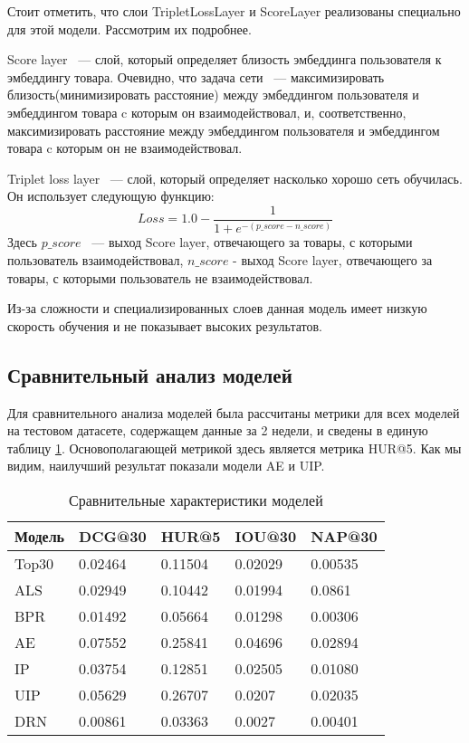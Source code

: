\documentclass[14pt]{mmcs_article}
\begin{document}
Стоит отметить, что слои TripletLossLayer и ScoreLayer реализованы специально для этой модели. Рассмотрим их подробнее.

Score layer  ~--- слой, который определяет близость эмбеддинга пользователя к эмбеддингу товара. Очевидно, что задача сети ~---  максимизировать близость(минимизировать расстояние) между эмбеддингом пользователя и эмбеддингом товара c которым он взаимодействовал, и, соответственно, максимизировать расстояние между эмбеддингом пользователя и эмбеддингом товара c которым он не взаимодействовал.

Triplet loss layer ~--- слой, который определяет насколько хорошо сеть обучилась. Он использует следующую функцию:
\begin{equation}
	Loss = 1.0 - \frac{1}{1 + e^{-(p\_score-n\_score)}}
\end{equation}
Здесь $p\_score$ ~--- выход Score layer, отвечающего за товары, с которыми пользователь взаимодействовал, $n\_score$ - выход Score layer, отвечающего за товары, с которыми пользователь не  взаимодействовал. 

Из-за сложности и специализированных слоев данная модель имеет низкую скорость обучения и не показывает высоких результатов.

\subsection{Сравнительный анализ моделей}
Для сравнительного анализа моделей была рассчитаны метрики для всех моделей на тестовом датасете, содержащем данные за 2 недели, и сведены в единую таблицу \ref{semifin:table:1}.
Основополагающей метрикой здесь является метрика HUR@5. Как мы видим, наилучший результат показали модели AE и UIP.
\begin{table}[H]
	\centering
	\caption{Сравнительные характеристики моделей}\label{semifin:table:1}
\begin{tabular}{| l |l| l| l| l|}
	\hline
	Модель & DCG@30 & HUR@5 & IOU@30 &  NAP@30 \\
	\hline
	Top30 & 0.02464 & 0.11504 & 0.02029 & 0.00535 \\
	\hline
	ALS & 0.02949 & 0.10442 & 0.01994 &  0.0861 \\
	\hline
	BPR & 0.01492 & 0.05664 & 0.01298 & 0.00306\\
	\hline
	AE & 0.07552 & 0.25841 & 0.04696 &  0.02894 \\
	\hline
	IP & 0.03754 & 0.12851 & 0.02505 & 0.01080 \\
	\hline
	UIP & 0.05629 & 0.26707 & 0.0207 &  0.02035 \\
	\hline
	DRN & 0.00861 & 0.03363 & 0.0027 & 0.00401 \\
	\hline
\end{tabular}
\end{table}
\end{document}
